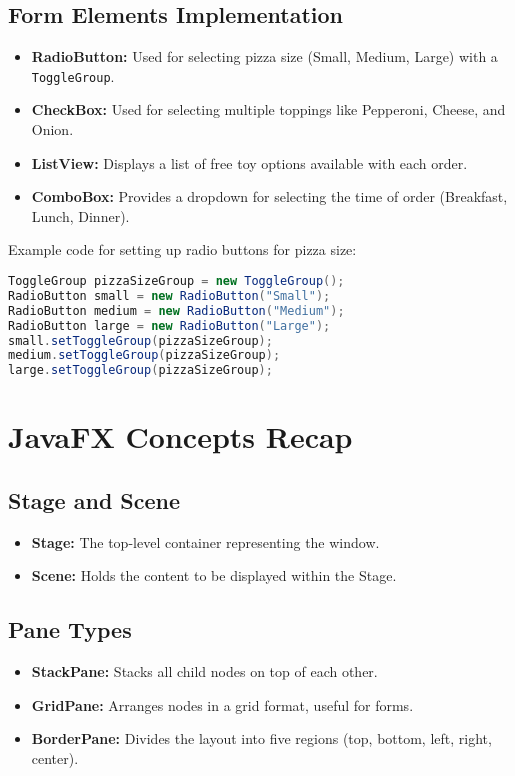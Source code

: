 \documentclass{article}
\begin{document}
\subsection{Form Elements Implementation}
\begin{itemize}
    \item \textbf{RadioButton:} Used for selecting pizza size (Small, Medium, Large) with a \texttt{ToggleGroup}.
    \item \textbf{CheckBox:} Used for selecting multiple toppings like Pepperoni, Cheese, and Onion.
    \item \textbf{ListView:} Displays a list of free toy options available with each order.
    \item \textbf{ComboBox:} Provides a dropdown for selecting the time of order (Breakfast, Lunch, Dinner).
\end{itemize}
Example code for setting up radio buttons for pizza size:
\begin{lstlisting}[language=Java]
ToggleGroup pizzaSizeGroup = new ToggleGroup();
RadioButton small = new RadioButton("Small");
RadioButton medium = new RadioButton("Medium");
RadioButton large = new RadioButton("Large");
small.setToggleGroup(pizzaSizeGroup);
medium.setToggleGroup(pizzaSizeGroup);
large.setToggleGroup(pizzaSizeGroup);
\end{lstlisting}

\section{JavaFX Concepts Recap}
\subsection{Stage and Scene}
\begin{itemize}
    \item \textbf{Stage:} The top-level container representing the window.
    \item \textbf{Scene:} Holds the content to be displayed within the Stage.
\end{itemize}

\subsection{Pane Types}
\begin{itemize}
    \item \textbf{StackPane:} Stacks all child nodes on top of each other.
    \item \textbf{GridPane:} Arranges nodes in a grid format, useful for forms.
    \item \textbf{BorderPane:} Divides the layout into five regions (top, bottom, left, right, center).
\end{itemize}
\end{document}
